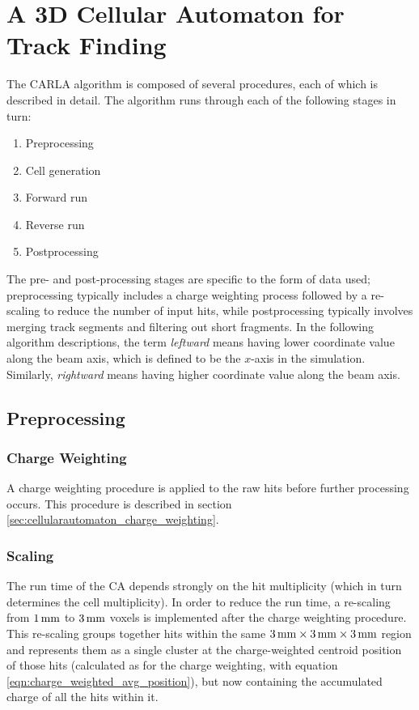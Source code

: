 \section{A 3D Cellular Automaton for Track Finding}\label{sec:cellularautomaton_algorithm}
The \ac{CARLA} algorithm is composed of several procedures, each of which is described in detail. The algorithm runs through each of the following stages in turn:

\begin{enumerate}
	\item Preprocessing
	\item Cell generation
	\item Forward run
	\item Reverse run
	\item Postprocessing
\end{enumerate}

The pre- and post-processing stages are specific to the form of data used; preprocessing typically includes a charge weighting process followed by a re-scaling to reduce the number of input hits, while postprocessing typically involves merging track segments and filtering out short fragments. In the following algorithm descriptions, the term \emph{leftward} means having lower coordinate value along the beam axis, which is defined to be the $x$-axis in the simulation. Similarly, \emph{rightward} means having higher coordinate value along the beam axis.

\subsection{Preprocessing}\label{sec:cellularautomaton_preprocessing}
\subsubsection{Charge Weighting}\label{sec:cellularautomaton_preprocessing_charge_weighting}
A charge weighting procedure is applied to the raw hits before further processing occurs. This procedure is described in section \ref{sec:cellularautomaton_charge_weighting}.

\subsubsection{Scaling}\label{sec:cellularautomaton_scaling}
The run time of the \ac{CA} depends strongly on the hit multiplicity (which in turn determines the cell multiplicity). In order to reduce the run time, a re-scaling from $1\,\mathrm{mm}$ to $3\,\mathrm{mm}$ voxels is implemented after the charge weighting procedure. This re-scaling groups together hits within the same $3\,\mathrm{mm} \times 3\,\mathrm{mm} \times 3\,\mathrm{mm}$ region and represents them as a single cluster at the charge-weighted centroid position of those hits (calculated as for the charge weighting, with equation \ref{eqn:charge_weighted_avg_position}), but now containing the accumulated charge of all the hits within it.

